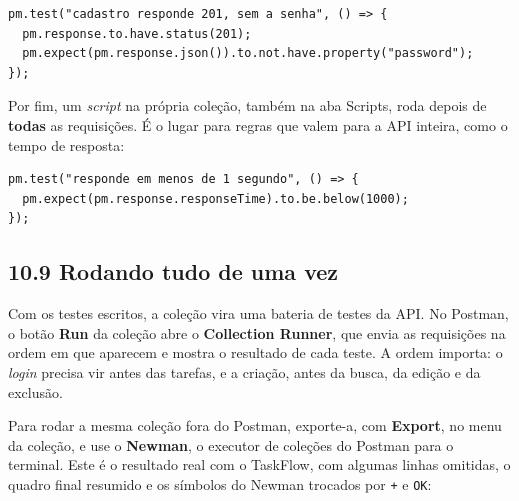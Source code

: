 \begin{codigo}
\begin{Verbatim}[breaklines=true, breaksymbolleft={}, fontsize=\footnotesize]
pm.test("cadastro responde 201, sem a senha", () => {
  pm.response.to.have.status(201);
  pm.expect(pm.response.json()).to.not.have.property("password");
});
\end{Verbatim}
\end{codigo}

Por fim, um \textit{script} na própria coleção, também na aba Scripts, roda depois de \textbf{todas} as requisições. É o lugar para regras que valem para a API inteira, como o tempo de resposta:

\begin{codigo}
\begin{Verbatim}[breaklines=true, breaksymbolleft={}, fontsize=\footnotesize]
pm.test("responde em menos de 1 segundo", () => {
  pm.expect(pm.response.responseTime).to.be.below(1000);
});
\end{Verbatim}
\end{codigo}

\subsection{10.9 Rodando tudo de uma vez}

Com os testes escritos, a coleção vira uma bateria de testes da API. No Postman, o botão \textbf{Run} da coleção abre o \textbf{Collection Runner}, que envia as requisições na ordem em que aparecem e mostra o resultado de cada teste. A ordem importa: o \textit{login} precisa vir antes das tarefas, e a criação, antes da busca, da edição e da exclusão.

Para rodar a mesma coleção fora do Postman, exporte-a, com \textbf{Export}, no menu da coleção, e use o \textbf{Newman}, o executor de coleções do Postman para o terminal. Este é o resultado real com o TaskFlow, com algumas linhas omitidas, o quadro final resumido e os símbolos do Newman trocados por \texttt{+} e \texttt{OK}:

